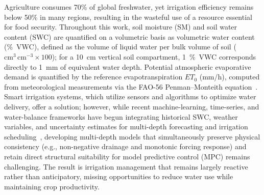 \documentclass[pdflatex,sn-nature]{sn-jnl}%
\theoremstyle{thmstyleone}%
\theoremstyle{thmstyletwo}%
\theoremstyle{thmstylethree}%
\begin{document}
Agriculture consumes 70\% of global freshwater\cite{scanlon2023}, yet irrigation efficiency remains below 50\% in many regions\cite{Mehta2024}, resulting in the wasteful use of a resource essential for food security. Throughout this work, soil moisture (SM) and soil water content (SWC) are quantified on a volumetric basis as volumetric water content (\si{\%VWC}), defined as the volume of liquid water per bulk volume of soil ($\mathrm{cm^3\,cm^{-3}} \times 100$); for a \SI{10}{cm} vertical soil compartment, \SI{1}{\%VWC} corresponds directly to \SI{1}{mm} of equivalent water depth. Potential atmospheric evaporative demand is quantified by the reference evapotranspiration $ET_0$ (\si{mm/h}), computed from meteorological measurements via the FAO-56 Penman--Monteith equation~\cite{allen1998crop}. Smart irrigation systems, which utilize sensors and algorithms to optimize water delivery, offer a solution; however, while recent machine-learning, time-series, and water-balance frameworks have begun integrating historical SWC, weather variables, and uncertainty estimates for multi-depth forecasting and irrigation scheduling~\cite{Zou2010, Bagheri2025, condeforecast2024}, developing multi-depth models that simultaneously preserve physical consistency (e.g., non-negative drainage and monotonic forcing response) and retain direct structural suitability for model predictive control (MPC) remains challenging. The result is irrigation management that remains largely reactive rather than anticipatory, missing opportunities to reduce water use while maintaining crop productivity.

\end{document}

